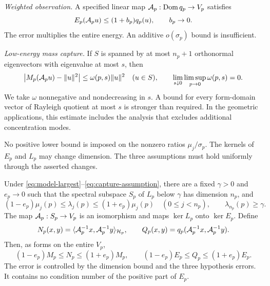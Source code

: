 \smallskip\noindent
\emph{Weighted observation.}
A specified linear map $\mathcal A_p:\operatorname{Dom} q_p\to V_p$ satisfies
\begin{equation}\label{eq:observation-assumption}
 E_p(\mathcal A_pu)\le(1+b_p)q_p(u),\qquad b_p\to0.
\end{equation}
The error multiplies the entire energy. An additive $o(\sigma_p)$
bound is insufficient.

\smallskip\noindent
\emph{Low-energy mass capture.}
If $S$ is spanned by at most $n_p+1$ orthonormal eigenvectors with
eigenvalue at most $s$, then
\begin{equation}\label{eq:capture-assumption}
 \bigl|M_p(\mathcal A_pu)-\|u\|^2\bigr|
       \le\omega(p,s)\|u\|^2\quad(u\in S),\qquad
 \lim_{s\downarrow0}\limsup_{p\to0}\omega(p,s)=0.
\end{equation}
We take $\omega$ nonnegative and nondecreasing in $s$. A bound for
every form-domain vector of Rayleigh quotient at most $s$ is stronger
than required. In the geometric applications, this estimate includes
the analysis that excludes additional concentration modes.

No positive lower bound is imposed on the nonzero ratios
$\mu_j/\sigma_p$. The kernels of $E_p$ and $L_p$ may change dimension.
The three assumptions must hold uniformly through the asserted changes.

\begin{theorem}\label{thm:relative-reduction}
Under \eqref{eq:model-largest}--\eqref{eq:capture-assumption}, there
are a fixed $\gamma>0$ and $e_p\to0$ such that the spectral subspace
$S_p$ of $L_p$ below $\gamma$ has dimension $n_p$, and
\begin{equation}\label{eq:abstract-rates}
 (1-e_p)\mu_j(p)\le\lambda_j(p)\le(1+e_p)\mu_j(p)
       \quad(0\le j<n_p),\qquad
 \lambda_{n_p}(p)\ge\gamma.
\end{equation}
The map $\mathcal A_p:S_p\to V_p$ is an isomorphism and maps
$\ker L_p$ onto $\ker E_p$. Define
\begin{equation}\label{eq:abstract-observed-forms}
 N_p(x,y)=\langle\mathcal A_p^{-1}x,\mathcal A_p^{-1}y\rangle_{\mathcal H_p},\qquad
 Q_p(x,y)=q_p(\mathcal A_p^{-1}x,\mathcal A_p^{-1}y).
\end{equation}
Then, as forms on the entire $V_p$,
\begin{equation}\label{eq:abstract-relative-forms}
 (1-e_p)M_p\le N_p\le(1+e_p)M_p,\qquad
 (1-e_p)E_p\le Q_p\le(1+e_p)E_p.
\end{equation}
The error is controlled by the dimension bound and the three hypothesis
errors. It contains no condition number of the positive part of $E_p$.
\end{theorem}


